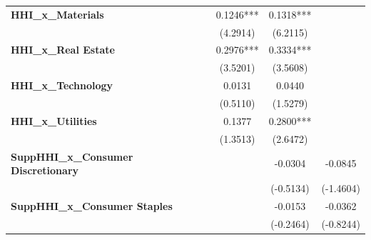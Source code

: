 \begin{center}
\begin{tabular}{lccccc}
\textbf{HHI\_x\_Materials}                    &                       &                        &       0.1246***        &         0.1318***          &                            \\
\textbf{ }                                    &                       &                        &        (4.2914)        &          (6.2115)          &                            \\
\textbf{HHI\_x\_Real Estate}                  &                       &                        &       0.2976***        &         0.3334***          &                            \\
\textbf{ }                                    &                       &                        &        (3.5201)        &          (3.5608)          &                            \\
\textbf{HHI\_x\_Technology}                   &                       &                        &         0.0131         &           0.0440           &                            \\
\textbf{ }                                    &                       &                        &        (0.5110)        &          (1.5279)          &                            \\
\textbf{HHI\_x\_Utilities}                    &                       &                        &         0.1377         &         0.2800***          &                            \\
\textbf{ }                                    &                       &                        &        (1.3513)        &          (2.6472)          &                            \\
\textbf{SuppHHI\_x\_Consumer Discretionary}   &                       &                        &                        &          -0.0304           &          -0.0845           \\
\textbf{ }                                    &                       &                        &                        &         (-0.5134)          &         (-1.4604)          \\
\textbf{SuppHHI\_x\_Consumer Staples}         &                       &                        &                        &          -0.0153           &          -0.0362           \\
\textbf{ }                                    &                       &                        &                        &         (-0.2464)          &         (-0.8244)          \\

\end{tabular}
\end{center}
